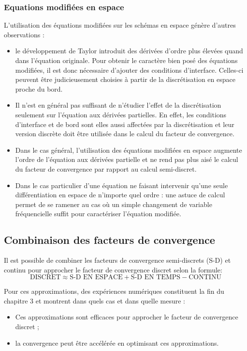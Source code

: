 \subsubsection*{Equations modifiées en espace}
L'utilisation des équations modifiées sur les schémas en espace
génère d'autres observations :
\begin{itemize}
	\item 
	le développement de Taylor introduit des dérivées
d'ordre plus élevées quand dans l'équation originale. Pour
obtenir le caractère bien posé des équations modifiées, il est donc
nécessaire d'ajouter des conditions d'interface. Celles-ci peuvent
être judicieusement choisies à partir de la discrétisation en espace
proche du bord.
	\item Il n'est en général pas suffisant de n'étudier
		l'effet de la discrétisation seulement sur
		l'équation aux dérivées partielles. En effet,
		les conditions d'interface et de bord sont
		elles aussi affectées par la discrétisation et
		leur version discrète doit être utilisée
		dans le calcul du facteur de convergence.
	\item Dans le cas général, l'utilisation des équations
	modifiées en espace augmente l'ordre de l'équation aux
	dérivées partielle et ne rend pas plus aisé
	le calcul du facteur de convergence par rapport
		au calcul semi-discret.
	\item Dans le cas particulier d'une équation ne faisant
	intervenir
	qu'une seule différentiation en espace de n'importe
	quel ordre :
	une astuce de calcul permet de se ramener au cas où un simple
	changement de variable fréquencielle suffit pour caractériser
		l'équation modifiée.
\end{itemize}
%
\subsection*{Combinaison des facteurs de convergence}
Il est possible de combiner les facteurs
de convergence semi-discrets (S-D) et continu pour approcher le
facteur de convergence discret selon la formule:
\begin{equation}
	\text{DISCRET} \approx
	\text{S-D EN ESPACE} +
	\text{S-D EN TEMPS} -
	\text{CONTINU}
\end{equation}
%
\par
Pour ces approximations, des expériences numériques constituent la fin
du chapitre 3 et montrent dans quels cas et dans quelle mesure :
\begin{itemize}
	\item
Ces approximations sont efficaces pour approcher le facteur
de convergence discret ;
	\item
la convergence
peut être accélérée en optimisant ces approximations.
\end{itemize}
